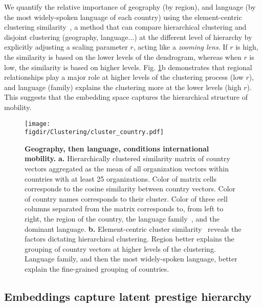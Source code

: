 \documentclass[12pt]{article} %
\def\figdir{../Figs}
\begin{document}
We quantify the relative importance of geography (by region), and language (by the most widely-spoken language of each country) using the element-centric clustering similarity~\autocite{gates2019element}, a method that can compare hierarchical clustering and disjoint clustering (geography, language...) at the different level of hierarchy by explicitly adjusting a scaling parameter $r$, acting like a \textit{zooming lens}.
If $r$ is high, the similarity is based on the lower levels of the dendrogram, whereas when $r$ is low, the similarity is based on higher levels.
Fig. \ref{fig:clustering}b demonstrates that regional relationships play a major role at higher levels of the clustering process (low $r$), and language (family) explains the clustering more at the lower levels (high $r$).
This suggests that the embedding space captures the hierarchical structure of mobility.


%
%
\begin{figure}[p!]
	\centering
	\texttt{[image: \\figdir/Clustering/cluster\_country.pdf]}
	\caption{
		\textbf{Geography, then language, conditions international mobility.}
		\textbf{a.} Hierarchically clustered similarity matrix of country vectors aggregated as the mean of all organization vectors within countries with at least 25 organizations.
		Color of matrix cells corresponds to the cosine similarity between country vectors.
		Color of country names corresponds to their cluster.
		Color of three cell columns separated from the matrix corresponds to, from left to right, the region of the country, the language family~\autocite{ethnologue}, and the dominant language.
		\textbf{b.}	Element-centric cluster similarity~\autocite{gates2019element} reveals the factors dictating hierarchical clustering.
		Region better explains the grouping of country vectors at higher levels of the clustering.
		Language family, and then the most widely-spoken language, better explain the fine-grained grouping of countries.
	}
	\label{fig:clustering}
\end{figure}



%
%
\subsection*{Embeddings capture latent prestige hierarchy}
\end{document}
